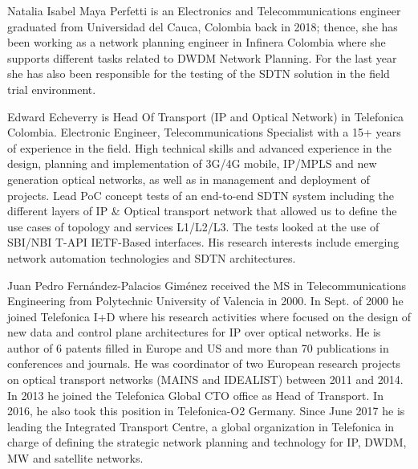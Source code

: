 \documentclass[a4paper,fleqn]{cas-dc}
\begin{document}
Natalia Isabel Maya Perfetti is an Electronics and Telecommunications engineer graduated from Universidad del Cauca, Colombia back in 2018; thence, she has been working as a network planning engineer in Infinera Colombia where she supports different tasks related to DWDM Network Planning. For the last year she has also been responsible for the testing of the SDTN solution in the field trial environment.
\endbio

Edward Echeverry is Head Of Transport (IP and Optical Network) in Telefonica Colombia. Electronic Engineer, Telecommunications Specialist with a 15+ years of experience in the field. High technical skills and advanced experience in the design, planning and implementation of 3G/4G mobile, IP/MPLS and new generation optical networks, as well as in management and deployment of projects. Lead PoC concept tests of an end-to-end SDTN system including the different layers of IP \& Optical transport network that allowed us to define the use cases of topology and services L1/L2/L3. The tests looked at the use of SBI/NBI T-API IETF-Based interfaces. His research interests include emerging network automation technologies and SDTN architectures.
\endbio

Juan Pedro Fernández-Palacios Giménez received the MS in Telecommunications Engineering from Polytechnic University of Valencia in 2000. In Sept. of 2000 he joined Telefonica I+D where his research activities where focused on the design of new data and control plane architectures for IP over optical networks. He is author of 6 patents filled in Europe and US and more than 70 publications in conferences and journals. He was coordinator of two European research projects on optical transport networks (MAINS and IDEALIST) between 2011 and 2014. In 2013 he joined the Telefonica Global CTO office as Head of Transport. In 2016, he also took this position in Telefonica-O2 Germany. Since June 2017 he is leading the Integrated Transport Centre, a global organization in Telefonica in charge of defining the strategic network planning and technology for IP, DWDM, MW and satellite networks.
\endbio
\end{document}
